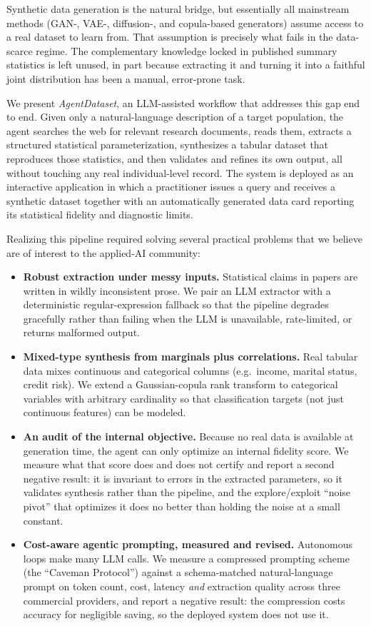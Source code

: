 \documentclass[letterpaper]{article} %
\begin{document}
Synthetic data generation is the natural bridge, but essentially all mainstream
methods (GAN-, VAE-, diffusion-, and copula-based generators) assume
access to a real dataset to learn from. That assumption is precisely what fails
in the data-scarce regime. The complementary knowledge locked in published
summary statistics is left unused, in part because extracting it and turning it
into a faithful joint distribution has been a manual, error-prone task.

We present \emph{AgentDataset}, an LLM-assisted workflow that addresses this gap
end to end. Given only a natural-language description of a target population,
the agent searches the web for relevant research documents, reads them,
extracts a structured statistical parameterization, synthesizes a tabular
dataset that reproduces those statistics, and then validates and refines its
own output, all without touching any real individual-level record. The
system is deployed as an interactive application in which a practitioner issues
a query and receives a synthetic dataset together with an automatically
generated data card reporting its statistical fidelity and diagnostic limits.

Realizing this pipeline required solving several practical problems that we
believe are of interest to the applied-AI community:

\begin{itemize}
    \item \textbf{Robust extraction under messy inputs.} Statistical claims in
    papers are written in wildly inconsistent prose. We pair an LLM extractor
    with a deterministic regular-expression fallback so that the pipeline
    degrades gracefully rather than failing when the LLM is unavailable,
    rate-limited, or returns malformed output.
    \item \textbf{Mixed-type synthesis from marginals plus correlations.} Real
    tabular data mixes continuous and categorical columns (e.g.\ income,
    marital status, credit risk). We extend a Gaussian-copula rank transform to
    categorical variables with arbitrary cardinality so that classification
    targets (not just continuous features) can be modeled.
    \item \textbf{An audit of the internal objective.} Because no real data is
    available at generation time, the agent can only optimize an internal
    fidelity score. We measure what that score does and does not certify and
    report a second negative result: it is invariant to errors in the extracted
    parameters, so it validates synthesis rather than the pipeline, and the
    explore/exploit ``noise pivot'' that optimizes it does no better than
    holding the noise at a small constant.
    \item \textbf{Cost-aware agentic prompting, measured and revised.}
    Autonomous loops make many LLM calls. We measure a compressed prompting
    scheme (the ``Caveman Protocol'') against a schema-matched natural-language
    prompt on token count, cost, latency \emph{and} extraction quality across
    three commercial providers, and report a negative result: the compression
    costs accuracy for negligible saving, so the deployed system does not use it.
\end{itemize}
\end{document}
